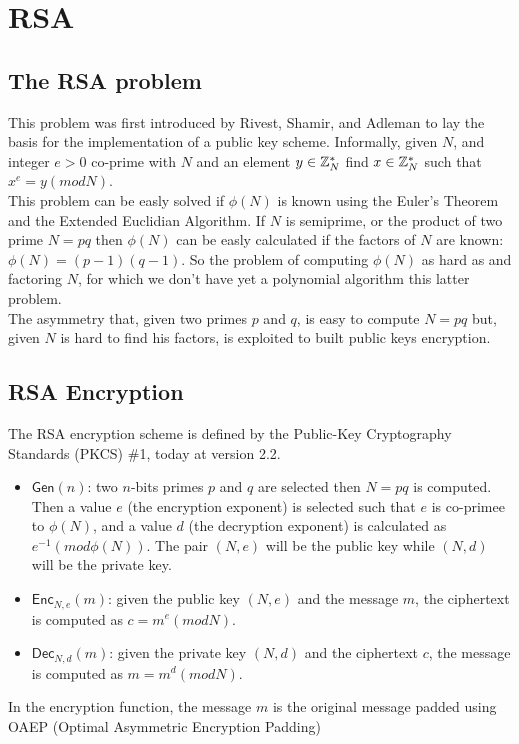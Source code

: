 \section{RSA}
\subsection{The RSA problem}
This problem was first introduced by Rivest, Shamir, and Adleman to lay the basis for the implementation of a public key scheme. Informally, given $N$, and integer $e > 0$  co-prime with $N$ and an element $y \in \mathbb{Z}_N^{*}$ find $x \in \mathbb{Z}_N^{*}$ such that $x^e = y (mod N)$.\\
This problem can be easly solved if $\phi(N)$ is known using the Euler's Theorem and the Extended Euclidian Algorithm. If $N$ is semiprime, or the product of two prime $N = pq$ then $\phi(N)$ can be easly calculated if the factors of $N$ are known: $\phi(N) = (p-1)(q-1)$. So the problem of computing $\phi(N)$ as hard as and factoring $N$, for which we don't have yet a polynomial algorithm this latter problem.\\
The asymmetry that, given two primes $p$ and $q$, is easy to compute $N = pq$ but, given $N$ is hard to find his factors, is exploited to built public keys encryption.

\subsection{RSA Encryption}
The RSA encryption scheme is defined by the Public-Key Cryptography Standards (PKCS) \#1, today at version 2.2.
\begin{itemize}
    \item{$\mathsf{Gen}(n)$: two $n$-bits primes $p$ and $q$ are selected then $N = pq$ is computed. Then a value $e$ (the encryption exponent) is selected such that $e$ is co-primee to $\phi(N)$, and a value $d$ (the decryption exponent) is calculated as $e^{-1} (mod \phi(N))$. The pair $(N, e)$ will be the public key while $(N, d)$ will be the private key.}
    \item{$\mathsf{Enc}_{N,e}(m)$: given the public key $(N, e)$ and the message $m$, the ciphertext is computed as $c = m^e (mod N)$.}
    \item{$\mathsf{Dec}_{N,d}(m)$: given the private key $(N, d)$ and the ciphertext $c$, the message is computed as $m = m^d (mod N)$.}
\end{itemize}
In the encryption function, the message $m$ is the original message padded using OAEP (Optimal Asymmetric Encryption Padding)
